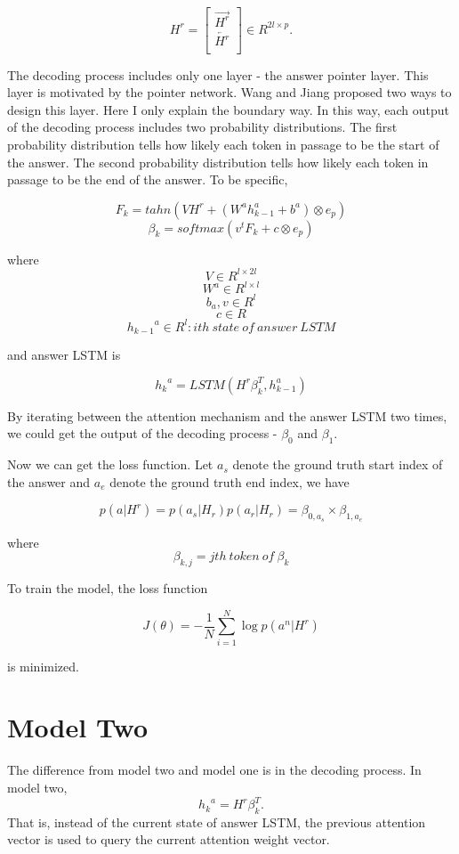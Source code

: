 \documentclass[modernstyle,12pt]{sjsuthesis}
\theoremstyle{definition}
\begin{document}
\[ H^r =
\begin{bmatrix}
\overrightarrow{H^r} \\
\overleftarrow{H^r} \\
\end{bmatrix}
\in R^{2l \times p}.
\]

The decoding process includes only one layer - the answer pointer layer. This layer is motivated by the pointer network. Wang and Jiang proposed two ways to design this layer. Here I only explain the boundary way. In this way, each output of the decoding process includes two probability distributions. The first probability distribution tells how likely each token in passage to be the start of the answer. The second probability distribution tells how likely each token in passage to be the end of the answer. To be specific,

$$F_k = tahn(VH^r + (W^a{h^a_{k-1}} +  b^a) \otimes e_p)$$
$$\beta _k = softmax(v^tF_k + c \otimes e_p)$$


where
$$V \in R^{l \times 2l}$$
$$W^a\in R^{l \times l} $$
$$b_a, v\in R^{l}  $$
$$c \in R $$
$${h_{k-1}}^a\in R^{l}: ith\ state\ of\ answer\ LSTM  $$

and answer LSTM is


$${h_k}^a = LSTM(H^r\beta _k^T, h_{k-1}^a)$$

By iterating between the attention mechanism and the answer LSTM two times, we could get the output of the decoding process - $\beta _0$ and $\beta _1$.


Now we can get the loss function. Let $a_s$ denote the ground truth start index of the answer and $a_e$ denote the ground truth end index, we have

$$p(a|H^r) = p(a_s|H_r)p(a_r|H_r)=\beta _{0, a_s} \times \beta_{1, a_e}$$

where $$\beta_{k, j} = jth\ token\ of\ \beta _k$$

To train the model, the loss function

$$J(\theta) = -\frac{1}{N}\sum_{i=1}^{N} \log{p(a^n|H^r)} $$

is minimized.

\section{Model Two} \label{sect:change_0}

The difference from model two and model one is in the decoding process. In model two,
$${h_k}^a = H^r\beta _{k}^T.$$
That is, instead of the current state of answer LSTM, the previous attention vector is used to query the current attention weight vector.
\end{document}
